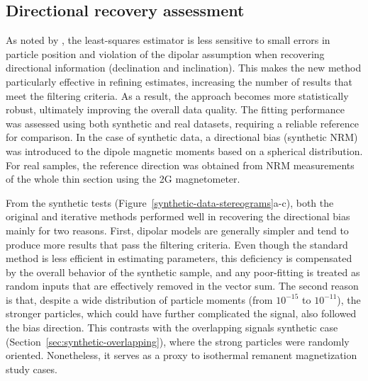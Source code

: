 \subsection{Directional recovery assessment}

As noted by \citet{Oliveira2015Estimation}, the least-squares estimator is less sensitive to small errors in particle position and violation of the dipolar assumption when recovering directional information (declination and inclination). This makes the new method particularly effective in refining estimates, increasing the number of results that meet the filtering criteria. As a result, the approach becomes more statistically robust, ultimately improving the overall data quality. The fitting performance was assessed using both synthetic and real datasets, requiring a reliable reference for comparison. In the case of synthetic data, a directional bias (synthetic NRM) was introduced to the dipole magnetic moments based on a spherical distribution. For real samples, the reference direction was obtained from NRM measurements of the whole thin section using the 2G magnetometer.

From the synthetic tests (Figure~\ref{synthetic-data-stereograms}a-c), both the original \citep{Souza-Junior2024} and iterative methods performed well in recovering the directional bias mainly for two reasons. First, dipolar models are generally simpler and tend to produce more results that pass the filtering criteria. Even though the standard method is less efficient in estimating parameters, this deficiency is compensated by the overall behavior of the synthetic sample, and any poor-fitting is treated as random inputs that are effectively removed in the vector sum. The second reason is that, despite a wide distribution of particle moments (from \(10^{-15}\) to \(10^{-11}\)), the stronger particles, which could have further complicated the signal, also followed the bias direction. This contrasts with the overlapping signals synthetic case (Section~\ref{sec:synthetic-overlapping}), where the strong particles were randomly oriented. Nonetheless, it serves as a proxy to isothermal remanent magnetization study cases.

